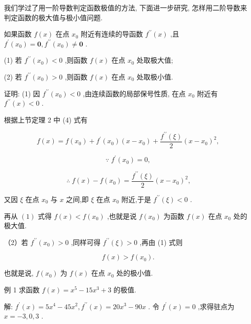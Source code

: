 \documentclass[lang=cn,newtx,10pt,scheme=chinese]{elegantbook}
\begin{document}
我们学过了用一阶导数判定函数极值的方法, 下面进一步研究, 怎样用二阶导数来判定函数的极大值与极小值问题.
\begin{theorem}[定理]

如果函数 \(f\left( x\right)\) 在点 \({x}_{0}\) 附近有连续的导函数 \({f}^{\prime \prime }\left( x\right)\) ,且 \({f}^{\prime }\left( {x}_{0}\right) = \mathbf{0},{f}^{\prime \prime }\left( {x}_{0}\right) \neq \mathbf{0}\) .

(1) 若 \({f}^{\prime \prime }\left( {x}_{0}\right) < 0\) ,则函数 \(f\left( x\right)\) 在点 \({x}_{0}\) 处取极大值;

(2) 若 \({f}^{\prime \prime }\left( {x}_{0}\right) > 0\) ,则函数 \(f\left( x\right)\) 在点 \({x}_{0}\) 处取极小值.

\end{theorem}

证明: (1) 因 \({f}^{\prime \prime }\left( {x}_{0}\right) < 0\) ,由连续函数的局部保号性质, 在点 \({x}_{0}\) 附近有 \({f}^{\prime \prime }\left( x\right) < 0\) .

根据上节定理 2 中 (4) 式有

\[
f\left( x\right) = f\left( {x}_{0}\right) + {f}^{\prime }\left( {x}_{0}\right) \left( {x - {x}_{0}}\right) + \frac{{f}^{\prime \prime }\left( \xi \right) }{2}{\left( x - {x}_{0}\right) }^{2},
\]

\[
\because \;{f}^{\prime }\left( {x}_{0}\right) = 0,
\]

\[
\therefore \;f\left( x\right) - f\left( {x}_{0}\right) = \frac{{f}^{\prime \prime }\left( \xi \right) }{2}{\left( x - {x}_{0}\right) }^{2}\text{,} \tag{1}
\]

又因 \(\xi\) 在点 \({x}_{0}\) 与 \(x\) 之间,即 \(\xi\) 在点 \({x}_{0}\) 附近,于是 \({f}^{\prime \prime }\left( \xi \right) < 0\) .

再从 \(\left( 1\right)\) 式得 \(f\left( x\right) < f\left( {x}_{0}\right)\) ,也就是说 \(f\left( {x}_{0}\right)\) 为函数 \(f\left( x\right)\) 在点 \({x}_{0}\) 处的极大值.

（2）若 \({f}^{\prime \prime }\left( {x}_{0}\right) > 0\) ,同样可得 \({f}^{\prime \prime }\left( \xi \right) > 0\) ,再由 (1) 式则

\[
f\left( x\right) > f\left( {x}_{0}\right) \text{.}
\]

也就是说, \(f\left( {x}_{0}\right)\) 为 \(f\left( x\right)\) 在点 \({x}_{0}\) 处的极小值.

例 1 求函数 \(f\left( x\right) = {x}^{5} - {15}{x}^{3} + 3\) 的极值.

解: \({f}^{\prime }\left( x\right) = 5{x}^{4} - {45}{x}^{2},{f}^{\prime \prime }\left( x\right) = {20}{x}^{3} - {90x}\) . 令 \({f}^{\prime }\left( x\right) = 0\) ,求得驻点为 \(x = - 3,0,3\) .
\end{document}
